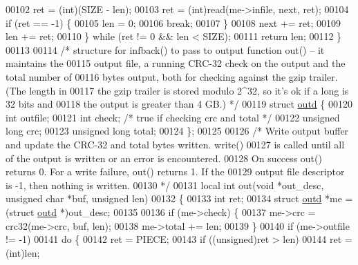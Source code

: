 \begin{DoxyCode}
00102             ret = (\textcolor{keywordtype}{int})(SIZE - len);
00103         ret = (int)read(me->infile, next, ret);
00104         \textcolor{keywordflow}{if} (ret == -1) \{
00105             len = 0;
00106             \textcolor{keywordflow}{break};
00107         \}
00108         next += ret;
00109         len += ret;
00110     \} \textcolor{keywordflow}{while} (ret != 0 && len < SIZE);
00111     \textcolor{keywordflow}{return} len;
00112 \}
00113 
00114 \textcolor{comment}{/* structure for infback() to pass to output function out() -- it maintains the}
00115 \textcolor{comment}{   output file, a running CRC-32 check on the output and the total number of}
00116 \textcolor{comment}{   bytes output, both for checking against the gzip trailer.  (The length in}
00117 \textcolor{comment}{   the gzip trailer is stored modulo 2^32, so it's ok if a long is 32 bits and}
00118 \textcolor{comment}{   the output is greater than 4 GB.) */}
00119 \textcolor{keyword}{struct }\hyperlink{structoutd}{outd} \{
00120     \textcolor{keywordtype}{int} outfile;
00121     \textcolor{keywordtype}{int} check;                  \textcolor{comment}{/* true if checking crc and total */}
00122     \textcolor{keywordtype}{unsigned} \textcolor{keywordtype}{long} crc;
00123     \textcolor{keywordtype}{unsigned} \textcolor{keywordtype}{long} total;
00124 \};
00125 
00126 \textcolor{comment}{/* Write output buffer and update the CRC-32 and total bytes written.  write()}
00127 \textcolor{comment}{   is called until all of the output is written or an error is encountered.}
00128 \textcolor{comment}{   On success out() returns 0.  For a write failure, out() returns 1.  If the}
00129 \textcolor{comment}{   output file descriptor is -1, then nothing is written.}
00130 \textcolor{comment}{ */}
00131 local \textcolor{keywordtype}{int} out(\textcolor{keywordtype}{void} *out\_desc, \textcolor{keywordtype}{unsigned} \textcolor{keywordtype}{char} *buf, \textcolor{keywordtype}{unsigned} len)
00132 \{
00133     \textcolor{keywordtype}{int} ret;
00134     \textcolor{keyword}{struct }\hyperlink{structoutd}{outd} *me = (\textcolor{keyword}{struct }\hyperlink{structoutd}{outd} *)out\_desc;
00135 
00136     \textcolor{keywordflow}{if} (me->check) \{
00137         me->crc = crc32(me->crc, buf, len);
00138         me->total += len;
00139     \}
00140     \textcolor{keywordflow}{if} (me->outfile != -1)
00141         \textcolor{keywordflow}{do} \{
00142             ret = PIECE;
00143             \textcolor{keywordflow}{if} ((\textcolor{keywordtype}{unsigned})ret > len)
00144                 ret = (int)len;

\end{DoxyCode}
